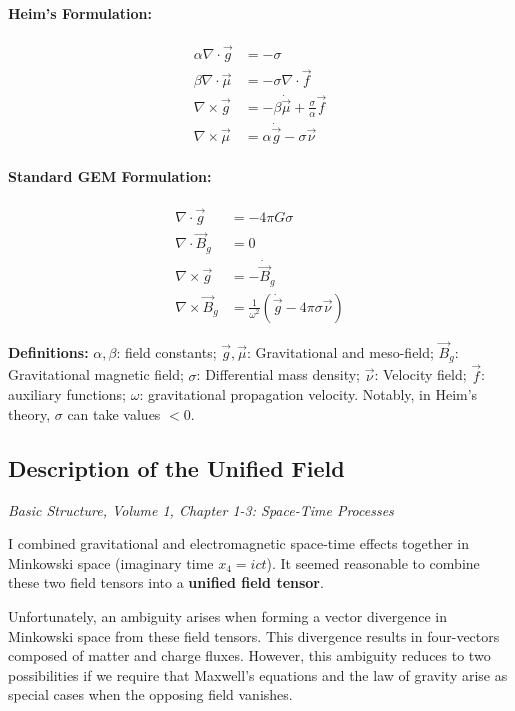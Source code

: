 \documentclass[11pt,a4paper,oneside]{article}
\begin{document}
\paragraph{Heim's Formulation:}
\begin{align}
    \alpha \nabla \cdot \vec{g} &= -\sigma \tag{5} \\
    \beta \nabla \cdot \vec{\mu} &= -\sigma \nabla \cdot \vec{f} \tag{6} \\
    \nabla \times \vec{g} &= -\beta \dot{\vec{\mu}} + \frac{\sigma}{\alpha} \vec{f} \tag{7} \\
    \nabla \times \vec{\mu} &= \alpha \dot{\vec{g}} - \sigma \vec{\nu} \tag{8}
\end{align}

\paragraph{Standard GEM Formulation:}
\begin{align}
    \nabla \cdot \vec{g} &= -4 \pi G \sigma \tag{5*} \\
    \nabla \cdot \vec{B}_g &= 0 \tag{6*} \\
    \nabla \times \vec{g} &= -\dot{\vec{B}}_g \tag{7*} \\
    \nabla \times \vec{B}_g &= \frac{1}{\omega^2}(\dot{\vec{g}} - 4 \pi \sigma \vec{\nu}) \tag{8*}
\end{align}

\noindent \textbf{Definitions:} $\alpha, \beta$: field constants; $\vec{g}, \vec{\mu}$: Gravitational and meso-field; $\vec{B}_g$: Gravitational magnetic field; $\sigma$: Differential mass density; $\vec{\nu}$: Velocity field; $\vec{f}$: auxiliary functions; $\omega$: gravitational propagation velocity. Notably, in Heim's theory, $\sigma$ can take values $< 0$.

\subsection{Description of the Unified Field}
\textit{Basic Structure, Volume 1, Chapter 1-3: Space-Time Processes}

I combined gravitational and electromagnetic space-time effects together in Minkowski space (imaginary time $x_4 = ict$). It seemed reasonable to combine these two field tensors into a \textbf{unified field tensor}.

Unfortunately, an ambiguity arises when forming a vector divergence in Minkowski space from these field tensors. This divergence results in four-vectors composed of matter and charge fluxes. However, this ambiguity reduces to two possibilities if we require that Maxwell's equations and the law of gravity arise as special cases when the opposing field vanishes.
\end{document}
